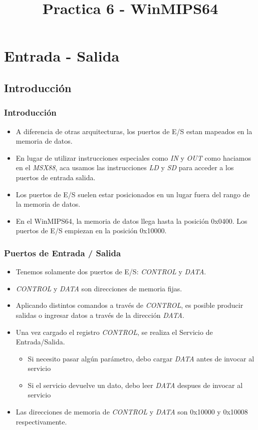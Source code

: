 \documentclass{beamer}
\title{Practica 6 - WinMIPS64}
\begin{document}
\section{Entrada - Salida}

\subsection{Introducción}
\begin{frame}
\frametitle{Introducción}
\begin{itemize}
\item A diferencia de otras arquitecturas, los puertos de E/S estan mapeados en la memoria de datos.
\item En lugar de utilizar instrucciones especiales como \emph{IN} y \emph{OUT} como haciamos en el \emph{MSX88}, aca usamos las instrucciones \emph{LD} y \emph{SD} para acceder a los puertos de entrada salida.
\item Los puertos de E/S suelen estar posicionados en un lugar fuera del rango de la memoria de datos.
\item En el WinMIPS64, la memoria de datos llega hasta la posición 0x0400. Los puertos de E/S empiezan en la posición 0x10000.

\end{itemize}
\end{frame}

\begin{frame}
\frametitle{Puertos de Entrada / Salida}
\begin{itemize}
\item Tenemos solamente dos puertos de E/S:  \emph{CONTROL} y \emph{DATA}.
\item \emph{CONTROL} y \emph{DATA} son direcciones de memoria fijas. 
\item Aplicando distintos comandos a través de \emph{CONTROL}, es posible producir salidas o ingresar datos a través de la dirección \emph{DATA}. 
\item Una vez cargado el registro \emph{CONTROL}, se realiza el Servicio de Entrada/Salida.
\begin{itemize}
\item Si necesito pasar algún parámetro, debo cargar \emph{DATA} antes de invocar al servicio
\item Si el servicio devuelve un dato, debo leer \emph{DATA} despues de invocar al servicio
\end{itemize}
\item Las direcciones de memoria de \emph{CONTROL} y \emph{DATA} son 0x10000 y 0x10008 respectivamente. 
\end{itemize}
\end{frame}
\end{document}
